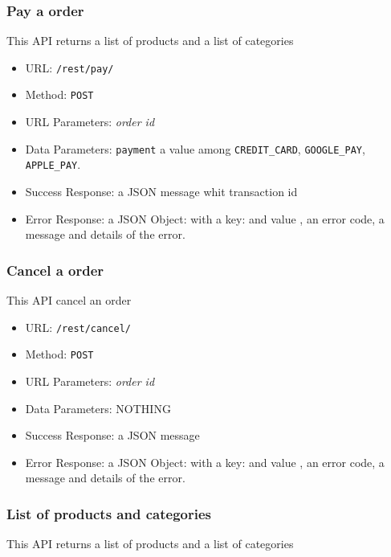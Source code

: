 \subsubsection*{Pay a order}

This API returns a list of products and a list of categories

\begin{itemize}
    \item URL: \texttt{/rest/pay/}
    \item Method: \texttt{POST}
    \item URL Parameters: \textit{order id}
    \item Data Parameters: \texttt{payment} a value among \texttt{CREDIT\_CARD}, \texttt{GOOGLE\_PAY}, \texttt{APPLE\_PAY}.
    \item Success Response: a JSON message whit transaction id
    \item Error Response: a JSON Object: with a key:   and value , an error code, a message and details of the error.

\end{itemize}

\subsubsection*{Cancel a order}

This API cancel an order

\begin{itemize}
    \item URL: \texttt{/rest/cancel/}
    \item Method: \texttt{POST}
    \item URL Parameters: \textit{order id}
    \item Data Parameters: NOTHING
    \item Success Response: a JSON message
    \item Error Response: a JSON Object: with a key:   and value , an error code, a message and details of the error.

\end{itemize}

\subsubsection*{List of products and categories}

This API returns a list of products and a list of categories

